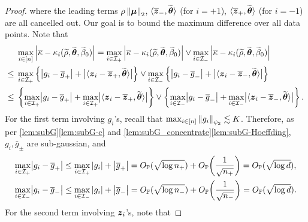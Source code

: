 \begin{proof}
where the leading terms $\rho\left\|{{\boldsymbol{\mu}}}\right\|_2$, $\langle \overline{\text{\boldmath $z$}}_-, \widetilde{{\boldsymbol{\theta}}}\rangle$ (for $i = +1$), $\langle \overline{\text{\boldmath $z$}}_+, \widetilde{{\boldsymbol{\theta}}}\rangle$ (for $i = -1$) are all cancelled out. 
Our goal is to bound the maximum difference over all data points. Note that
\begin{equation}\label{eq:max_diff}
    \begin{aligned}
        & \max_{i \in [n]} \left|{\overline\kappa - \kappa_i(\widetilde\rho, \widetilde{{\boldsymbol{\theta}}}, \widetilde\beta_0)}\right|
        = 
        \max_{i \in \mathcal{I}_+} \left|{\overline\kappa - \kappa_i(\widetilde\rho, \widetilde{{\boldsymbol{\theta}}}, \widetilde\beta_0)}\right|
         \vee
        \max_{i \in \mathcal{I}_-} \left|{\overline\kappa - \kappa_i(\widetilde\rho, \widetilde{{\boldsymbol{\theta}}}, \widetilde\beta_0)}\right|  \\
        \le {} & 
        \max_{i \in \mathcal{I}_+} \left\{ \bigl|g_i - \overline g_+\bigr| + \bigl|\langle \text{\boldmath $z$}_i - \overline{\text{\boldmath $z$}}_+, \widetilde{{\boldsymbol{\theta}}} \rangle\bigr| \right\}
        \vee
        \max_{i \in \mathcal{I}_-} \left\{ \bigl|g_i - \overline g_-\bigr| + \bigl|\langle \text{\boldmath $z$}_i - \overline{\text{\boldmath $z$}}_-, \widetilde{{\boldsymbol{\theta}}} \rangle\bigr| 
        \right\} 
        \\
        \le {} & \left\{ 
            \max_{i \in \mathcal{I}_+} \bigl|g_i - \overline g_+\bigr|
            + \max_{i \in \mathcal{I}_+} \bigl|\langle \text{\boldmath $z$}_i - \overline{\text{\boldmath $z$}}_+, \widetilde{{\boldsymbol{\theta}}} \rangle\bigr|
        \right\}
        \vee
        \left\{ 
            \max_{i \in \mathcal{I}_-} \bigl|g_i - \overline g_-\bigr|
            + \max_{i \in \mathcal{I}_-} \bigl|\langle \text{\boldmath $z$}_i - \overline{\text{\boldmath $z$}}_-, \widetilde{{\boldsymbol{\theta}}} \rangle\bigr|
        \right\}.
    \end{aligned}
\end{equation}
For the first term involving $g_i$'s, recall that $\max_{i \in [n]}\left\|{g_i}\right\|_{\psi_2} \lesssim K$. Therefore, as per \cref{lem:subG}\ref{lem:subG-c} and \cref{lem:subG_concentrate}\ref{lem:subG-Hoeffding}, $g_i, \bar g_\pm$ are sub-gaussian, and
\begin{equation}\label{eq:max_g}
    \begin{aligned}
        \max_{i \in \mathcal{I}_+} \bigl|g_i - \overline g_+\bigr|
        & \le \max_{i \in \mathcal{I}_+} \left|{g_i}\right| + \left|{\overline g_+}\right| 
        = O_{\mathbb{P}}(\sqrt{\log n_+}) + O_{\mathbb{P}}\biggl( \frac{1}{\sqrt{n_+}} \biggr)
        = O_{\mathbb{P}}(\sqrt{\log d}), \\
        \max_{i \in \mathcal{I}_-} \bigl|g_i - \overline g_-\bigr|
        & \le \max_{i \in \mathcal{I}_-} \left|{g_i}\right| + \left|{\overline g_-}\right| 
        = O_{\mathbb{P}}(\sqrt{\log n_-}) + O_{\mathbb{P}}\biggl( \frac{1}{\sqrt{n_-}} \biggr)
        = O_{\mathbb{P}}(\sqrt{\log d}).
    \end{aligned}
\end{equation}
For the second term involving $\text{\boldmath $z$}_i$'s, note that

\end{proof}
